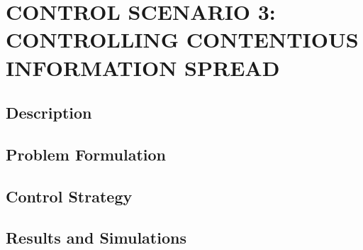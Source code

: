\chapter{CONTROL SCENARIO 3: CONTROLLING CONTENTIOUS INFORMATION SPREAD}

\section{Description}

\section{Problem Formulation}

\section{Control Strategy}

\section{Results and Simulations}